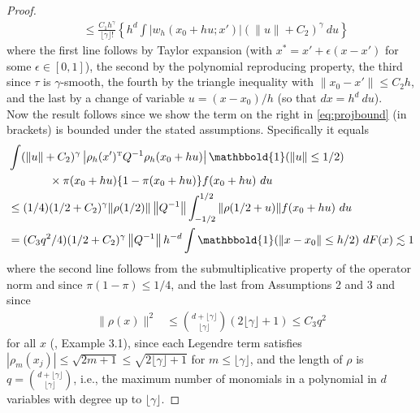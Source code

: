 \documentclass[11pt,twoside]{article}
\def\T{{ \mathrm{\scriptscriptstyle T} }}
\newcommand{\one}{\mathbbold{1}}
\theoremstyle{definition}
\theoremstyle{remark}
\begin{document}
\begin{proof}
\begin{align}
&\leq \frac{C_1h^\gamma}{{\lfloor \gamma \rfloor}!} \left\{ h^d \int   \left| w_h(x_0+hu; x')   \right|  (\|u\|+C_2)^{\gamma}\ du \right\} \label{eq:projbound}
\end{align}
where the first line follows by Taylor expansion (with $x^* = x' +\epsilon(x-x')$ for some $\epsilon \in [0,1]$), the second by the polynomial reproducing property, the third since $\tau$ is $\gamma$-smooth, the fourth by the triangle inequality with $\|x_0 - x' \| \leq C_2 h$, and the last by a change of variable $u=(x-x_0)/h$ (so that $dx = h^d \ du$). \\

Now the result follows since we show the term on the right in \eqref{eq:projbound} (in brackets) is bounded under the stated assumptions. Specifically it equals
\begin{align*}
&  \int (\|u\|+C_2)^\gamma \left| \rho_h(x')^\T Q^{-1} \rho_h(x_0+hu) \right|  \one(\|u\| \leq 1/2) \\
& \hspace{.5in} \times \pi(x_0+hu) \{1-\pi(x_0+hu)\} f(x_0+hu) \ du \\
&\leq (1/4)(1/2+C_2)^\gamma \|\rho(1/2) \| \left\| Q^{-1} \right\|   \int_{-1/2}^{1/2} \| \rho(1/2+u) \| f(x_0+hu) \ du \\
&=  (C_3q^2/4)(1/2+C_2)^\gamma \left\| Q^{-1} \right\| h^{-d}  \int \one(\|x-x_0\| \leq h/2) \ dF(x) \lesssim 1
\end{align*}
where the second line follows from the submultiplicative property of the operator norm and since $\pi(1-\pi) \leq 1/4$, and the last  from Assumptions 2 and 3 and since
\begin{align*}
\| \rho(x) \|^2 & \leq  {{ d + \lfloor \gamma \rfloor } \choose { \lfloor\gamma \rfloor }} (2\lfloor \gamma \rfloor  + 1) \leq C_3q^2
\end{align*}
for all $x$ (\citet{belloni2015some}, Example 3.1), since each Legendre term satisfies $| \rho_m(x_j)| \leq \sqrt{2m+1} \leq \sqrt{2\lfloor \gamma \rfloor + 1}$ for $m \leq \lfloor \gamma \rfloor$, and the length of $\rho$ is $q={{ d + \lfloor \gamma \rfloor } \choose { \lfloor\gamma \rfloor }} $, i.e., the maximum number of monomials in a polynomial in $d$ variables with degree up to $\lfloor \gamma \rfloor$. 
\end{proof}

\bigskip
\end{document}
